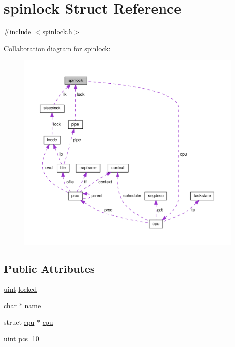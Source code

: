 \hypertarget{structspinlock}{}\section{spinlock Struct Reference}
\label{structspinlock}


{\ttfamily \#include $<$spinlock.\+h$>$}



Collaboration diagram for spinlock\+:\nopagebreak
\begin{figure}[H]
\begin{center}
\leavevmode
\includegraphics[width=350pt]{da/d23/structspinlock__coll__graph}
\end{center}
\end{figure}
\subsection*{Public Attributes}
\begin{DoxyCompactItemize}
\item 
\hyperlink{types_8h_a91ad9478d81a7aaf2593e8d9c3d06a14}{uint} \hyperlink{structspinlock_a48f3007579f644934d9aba91e5378c03}{locked}
\item 
char $\ast$ \hyperlink{structspinlock_afbec3274bf8ad9c421695a22f8d9d584}{name}
\item 
struct \hyperlink{structcpu}{cpu} $\ast$ \hyperlink{structspinlock_a290ae772c8ccb9e8c1580204c31a7f88}{cpu}
\item 
\hyperlink{types_8h_a91ad9478d81a7aaf2593e8d9c3d06a14}{uint} \hyperlink{structspinlock_ac9ef3f16f664094198af0b9063e23fe0}{pcs} \mbox{[}10\mbox{]}
\end{DoxyCompactItemize}


